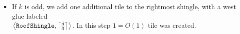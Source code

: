 \begin{itemize}
    \item If $k$ is odd, we add one additional tile to the rightmost shingle, with a west glue labeled\\ $\left\langle {\tt RoofShingle}, \ceil*{\frac{d}{3}} \right\rangle$.
    In this step $1 = O(1)$ tile was created.

\end{itemize}


\begin{figure}[H]
    \centering

\end{figure}
